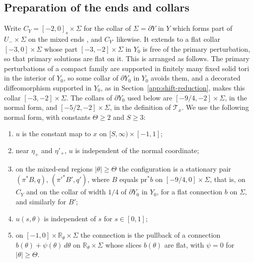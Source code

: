 \documentclass[11pt]{amsart}
\theoremstyle{definition}
\theoremstyle{remark}
\theoremstyle{plain}
\numberwithin{equation}{section}
\newcommand{\RR}{\mathbb R}
\begin{document}
\subsection{Preparation of the ends and collars}\label{app:shift-prep}
Write $C_Y=[-2,0]_s\times\Sigma$ for the collar of $\Sigma=\partial Y$ in
$Y$ which forms part of $U_-\times\Sigma$ on the mixed ends
\cite[Section~3.1]{DFL}, and $C_{Y'}$ likewise. It extends to a flat
collar $[-3,0]\times\Sigma$ whose part $[-3,-2]\times\Sigma$ in $Y_0$ is free of
the primary perturbation, so that primary solutions are flat on it. This
is arranged as follows. The primary perturbations of a compact family
are supported in finitely many fixed solid tori in the interior of
$Y_0$, so some collar of $\partial Y_0$ in $Y_0$ avoids them, and a
decorated diffeomorphism supported in $Y_0$, as in
Section~\ref{app:shift-reduction}, makes this collar
$[-3,-2]\times\Sigma$. The
collars of $\partial Y_0$ used below are $[-9/4,-2]\times\Sigma$, in the
normal form, and $[-5/2,-2]\times\Sigma$, in the definition of
$\mathcal T_x$. We use the following normal form, with constants
$\Theta\ge2$ and $S\ge3$:
\begin{enumerate}[label=(N\arabic*)]
\item $u$ is the constant map to $x$ on $[S,\infty)\times[-1,1]$;
\item near $\eta_+$ and $\eta'_+$, $u$ is independent of the normal
coordinate;
\item on the mixed-end regions $|\theta|\ge\Theta$ the configuration is a
stationary pair $(\pi^*B,q)$, $(\pi'^*B',q')$, where $B$ equals
$\mathrm{pr}^*b$ on $[-9/4,0]\times\Sigma$, that is, on $C_Y$ and on the collar of
width $1/4$ of $\partial Y_0$ in $Y_0$, for a flat connection $b$ on
$\Sigma$, and similarly for $B'$;
\item $u(s,\theta)$ is independent of $s$ for $s\in[0,1]$;
\item on $[-1,0]\times\RR_\theta\times\Sigma$ the connection is the pullback
of a connection $b(\theta)+\psi(\theta)\,d\theta$ on $\RR_\theta\times\Sigma$
whose slices $b(\theta)$ are flat, with $\psi=0$ for $|\theta|\ge\Theta$.
\end{enumerate}
\end{document}

